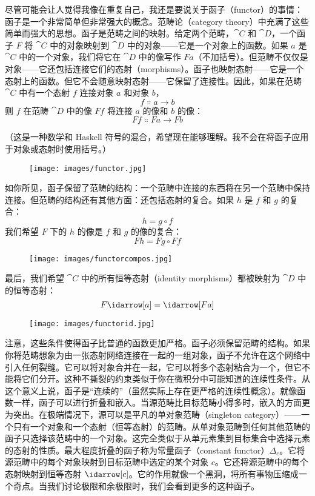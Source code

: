 
\lettrine[lhang=0.17]{尽}{管可能会让人觉得我像在重复自己}，我还是要说关于函子（functor）的事情：函子是一个非常简单但非常强大的概念。范畴论（category theory）中充满了这些简单而强大的思想。函子是范畴之间的映射。给定两个范畴，$\cat{C}$ 和 $\cat{D}$，一个函子 $F$ 将 $\cat{C}$ 中的对象映射到 $\cat{D}$ 中的对象——它是一个对象上的函数。如果 $a$ 是 $\cat{C}$ 中的一个对象，我们将它在 $\cat{D}$ 中的像写作 $F a$（不加括号）。但范畴不仅仅是对象——它还包括连接它们的态射（morphisms）。函子也映射态射——它是一个态射上的函数。但它不会随意映射态射——它保留了连接性。因此，如果在范畴 $\cat{C}$ 中有一个态射 $f$ 连接对象 $a$ 和对象 $b$，
\[f \Colon a \to b\]
则 $f$ 在范畴 $\cat{D}$ 中的像 $F f$ 将连接 $a$ 的像和 $b$ 的像：
\[F f \Colon F a \to F b\]

（这是一种数学和 Haskell 符号的混合，希望现在能够理解。我不会在将函子应用于对象或态射时使用括号。）

\begin{figure}[H]
  \centering\texttt{[image: images/functor.jpg]}
\end{figure}

\noindent
如你所见，函子保留了范畴的结构：一个范畴中连接的东西将在另一个范畴中保持连接。但范畴的结构还有其他方面：还包括态射的复合。如果 $h$ 是 $f$ 和 $g$ 的复合：
\[h = g \circ f\]
我们希望 $F$ 下的 $h$ 的像是 $f$ 和 $g$ 的像的复合：
\[F h = F g \circ F f\]

\begin{figure}[H]
  \centering
  \texttt{[image: images/functorcompos.jpg]}
\end{figure}

\noindent
最后，我们希望 $\cat{C}$ 中的所有恒等态射（identity morphisms）都被映射为 $\cat{D}$ 中的恒等态射：
\[F \idarrow[a] = \idarrow[F a]\]

\begin{figure}[H]
  \centering
  \texttt{[image: images/functorid.jpg]}
\end{figure}

\noindent
注意，这些条件使得函子比普通的函数更加严格。函子必须保留范畴的结构。如果你将范畴想象为由一张态射网络连接在一起的一组对象，函子不允许在这个网络中引入任何裂缝。它可以将对象合并在一起，它可以将多个态射粘合为一个，但它不能将它们分开。这种不撕裂的约束类似于你在微积分中可能知道的连续性条件。从这个意义上说，函子是“连续的”（虽然实际上存在更严格的连续性概念）。就像函数一样，函子可以进行折叠和嵌入。当源范畴比目标范畴小得多时，嵌入的方面更为突出。在极端情况下，源可以是平凡的单对象范畴（singleton category）——一个只有一个对象和一个态射（恒等态射）的范畴。从单对象范畴到任何其他范畴的函子只选择该范畴中的一个对象。这完全类似于从单元素集到目标集合中选择元素的态射的性质。最大程度折叠的函子称为常量函子（constant functor）$\Delta_c$。它将源范畴中的每个对象映射到目标范畴中选定的某个对象 $c$。它还将源范畴中的每个态射映射到恒等态射 $\idarrow[c]$。它的作用就像一个黑洞，将所有事物压缩成一个奇点。当我们讨论极限和余极限时，我们会看到更多的这种函子。

